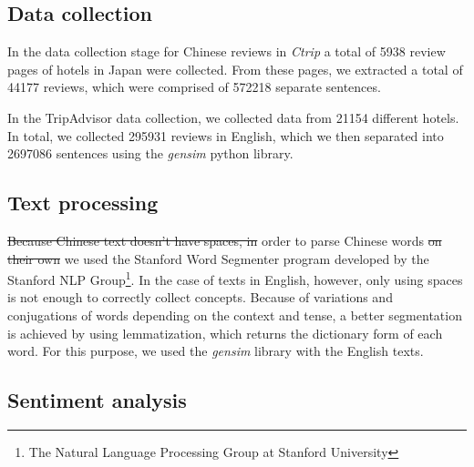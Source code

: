\documentclass[review]{elsarticle}
\providecommand{\DIFadd}[1]{{\protect\color{blue}\uwave{#1}}} %
\providecommand{\DIFdel}[1]{{\protect\color{red}\sout{#1}}}                      %
\providecommand{\DIFaddbegin}{} %
\providecommand{\DIFaddend}{} %
\providecommand{\DIFdelbegin}{} %
\providecommand{\DIFdelend}{} %
\newcommand{\DIFscaledelfig}{0.5}
\newlength{\DIFdelgraphicswidth} %
\newlength{\DIFdelgraphicsheight} %
\newcommand{\DIFaddincludegraphics}[2][]{{\color{blue}\fbox{\DIFOincludegraphics[#1]{#2}}}} %
\newcommand{\DIFdelincludegraphics}[2][]{%
\sbox{\DIFdelgraphicsbox}{\DIFOincludegraphics[#1]{#2}}%
\settoboxwidth{\DIFdelgraphicswidth}{\DIFdelgraphicsbox} %
\settoboxtotalheight{\DIFdelgraphicsheight}{\DIFdelgraphicsbox} %
\scalebox{\DIFscaledelfig}{%
\parbox[b]{\DIFdelgraphicswidth}{\usebox{\DIFdelgraphicsbox}\\[-\baselineskip] \rule{\DIFdelgraphicswidth}{0em}}\llap{\resizebox{\DIFdelgraphicswidth}{\DIFdelgraphicsheight}{%
\setlength{\unitlength}{\DIFdelgraphicswidth}%
\begin{picture}(1,1)%
\thicklines\linethickness{2pt} %
{\color[rgb]{1,0,0}\put(0,0){\framebox(1,1){}}}%
{\color[rgb]{1,0,0}\put(0,0){\line( 1,1){1}}}%
{\color[rgb]{1,0,0}\put(0,1){\line(1,-1){1}}}%
\end{picture}%
}\hspace*{3pt}}} %
} %
\DeclareRobustCommand{\DIFaddbegin}{\DIFOaddbegin \let\includegraphics\DIFaddincludegraphics} %
\DeclareRobustCommand{\DIFaddend}{\DIFOaddend \let\includegraphics\DIFOincludegraphics} %
\DeclareRobustCommand{\DIFdelbegin}{\DIFOdelbegin \let\includegraphics\DIFdelincludegraphics} %
\DeclareRobustCommand{\DIFdelend}{\DIFOaddend \let\includegraphics\DIFOincludegraphics} %
\begin{document}
\subsection{Data collection}\label{datacollection}

In the data collection stage for Chinese reviews in \textit{Ctrip} a total of \num[group-separator={,}]{5938} review pages of hotels in Japan were collected. From these pages, we extracted a total of \num[group-separator={,}]{44177} reviews, which were comprised of \num[group-separator={,}]{572218} separate sentences. 

\DIFdelbegin %

\DIFdelend In the TripAdvisor data collection, we collected data from \num[group-separator={,}]{21154} different hotels. In total, we collected \num[group-separator={,}]{295931} reviews in English, which we then separated into \num[group-separator={,}]{2697086} sentences using the \textit{gensim} python library. 

\subsection{Text processing}\label{textprocessing}

\DIFdelbegin \DIFdel{Because Chinese text doesn't have spaces, in }\DIFdelend \DIFaddbegin \DIFadd{In }\DIFaddend order to parse Chinese words \DIFdelbegin \DIFdel{on their own }\DIFdelend \DIFaddbegin \DIFadd{and separate them }\DIFaddend we used the Stanford Word Segmenter \cite[][]{chang2008} program developed by the Stanford NLP Group\footnote{\label{stanfordnlp}The Natural Language Processing Group at Stanford University}. In the case of texts in English, however, only using spaces is not enough to correctly collect concepts. Because of variations and conjugations of words depending on the context and tense, a better segmentation is achieved by using lemmatization, which returns the dictionary form of each word. For this purpose, we used the \textit{gensim} library with the English texts.

\subsection{Sentiment analysis}\label{sentimentanalysis}
\end{document}
